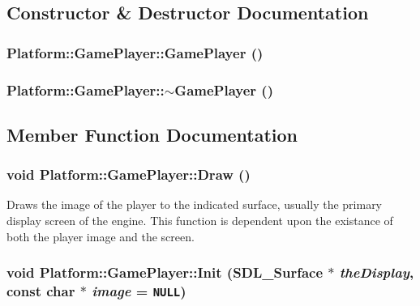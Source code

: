 \subsection{Constructor \& Destructor Documentation}
\hypertarget{class_platform_1_1_game_player_ae7a4bb8381fe5377a0db83488dacb56}{
\subsubsection[{GamePlayer}]{\setlength{\rightskip}{0pt plus 5cm}Platform::GamePlayer::GamePlayer ()}}
\label{d4/d4e/class_platform_1_1_game_player_ae7a4bb8381fe5377a0db83488dacb56}


\hypertarget{class_platform_1_1_game_player_6ca29b4989ceeef4b05e1404fa4bcdd8}{
\subsubsection[{$\sim$GamePlayer}]{\setlength{\rightskip}{0pt plus 5cm}Platform::GamePlayer::$\sim$GamePlayer ()}}
\label{d4/d4e/class_platform_1_1_game_player_6ca29b4989ceeef4b05e1404fa4bcdd8}




\subsection{Member Function Documentation}
\hypertarget{class_platform_1_1_game_player_60966ecce397b55523f66b96753435aa}{
\subsubsection[{Draw}]{\setlength{\rightskip}{0pt plus 5cm}void Platform::GamePlayer::Draw ()}}
\label{d4/d4e/class_platform_1_1_game_player_60966ecce397b55523f66b96753435aa}


Draws the image of the player to the indicated surface, usually the primary display screen of the engine. This function is dependent upon the existance of both the player image and the screen. \hypertarget{class_platform_1_1_game_player_1a8a150999ae7f2abf6362ecc5d9923d}{
\subsubsection[{Init}]{\setlength{\rightskip}{0pt plus 5cm}void Platform::GamePlayer::Init (SDL\_\-Surface $\ast$ {\em theDisplay}, \/  const char $\ast$ {\em image} = {\tt NULL})}}
\label{d4/d4e/class_platform_1_1_game_player_1a8a150999ae7f2abf6362ecc5d9923d}



